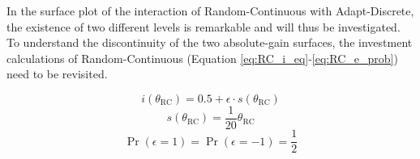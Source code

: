 \documentclass[11pt]{article}
\begin{document}


	\noindent
	In the surface plot of the interaction of Random-Continuous with Adapt-Discrete, the existence of two different levels is remarkable and will thus be investigated.
	To understand the discontinuity of the two absolute-gain surfaces, the investment calculations of Random-Continuous (Equation \ref{eq:RC_i_eq}-\ref{eq:RC_e_prob}) need to be revisited.

\begin{equation}
	i(\theta_{\mathrm{RC}}) = 0.5 + \epsilon \cdot s(\theta_{\mathrm{RC}})
	\label{eq:RC_i_eq_discuss}
\end{equation}
\begin{equation}
	s(\theta_{\mathrm{RC}}) = \frac{1}{20} {\theta_{\mathrm{RC}}}
	\label{eq:RC_s_eq_discuss}
\end{equation}
\begin{equation}
	\Pr(\epsilon = 1) = \Pr(\epsilon = -1) = \frac{1}{2}
	\label{eq:RC_e_prob_discuss}
\end{equation}
\end{document}
